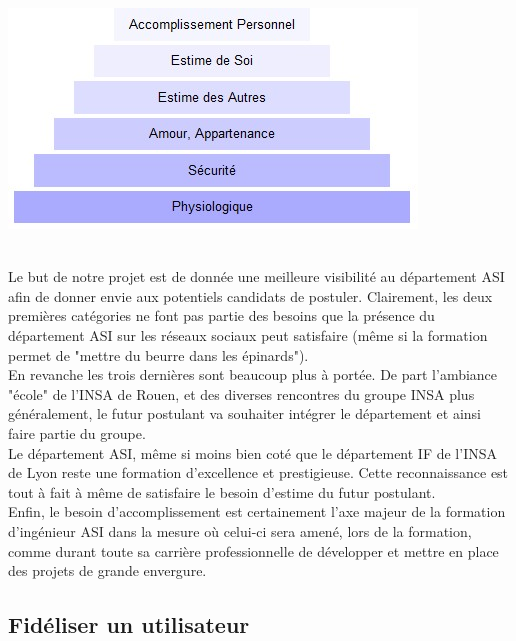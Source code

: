 \begin{center}
\includegraphics[scale=0.5]{./image/pyramidemaslow.jpg}
\end{center}
~~\\
\indent Le but de notre projet est de donnée une meilleure visibilité au département ASI afin de donner envie aux potentiels candidats de postuler. Clairement, les deux premières catégories ne font pas partie des besoins que la présence du département ASI sur les réseaux sociaux peut satisfaire (même si la formation permet de "mettre du beurre dans les épinards"). ~~\\
\indent En revanche les trois dernières sont beaucoup plus à portée. 
\indent De part l'ambiance "école" de l'INSA de Rouen, et des diverses rencontres du groupe INSA plus généralement, le futur postulant va souhaiter intégrer le département et ainsi faire partie du groupe. ~~\\
\indent Le département ASI, même si moins bien coté que le département IF de l'INSA de Lyon reste une formation d'excellence et prestigieuse. Cette reconnaissance est tout à fait à même de satisfaire le besoin d'estime du futur postulant. ~~\\
\indent Enfin, le besoin d'accomplissement est certainement l'axe majeur de la formation d'ingénieur ASI dans la mesure où celui-ci sera amené, lors de la formation, comme durant toute sa carrière professionnelle de développer et mettre en place des projets de grande envergure.

\subsection{Fidéliser un utilisateur}

